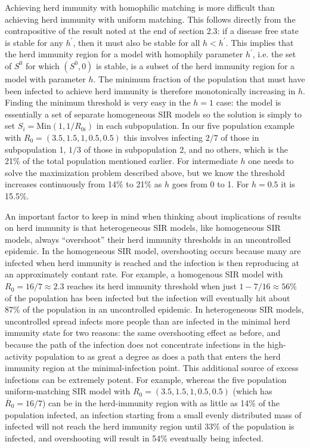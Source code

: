 \documentclass[11pt]{article}
\begin{document}
Achieving herd immunity with homophilic matching is more difficult than achieving herd immunity with uniform matching. This follows directly from the
contrapositive of the result noted at the end of section 2.3:
if a disease free state is stable for any $h^{\prime}$, then it must also be stable for all 
$h < h^{\prime}$. This implies that the herd immunity
region for a model with homophily parameter $h^{\prime}$, i.e. the set of $S^0$ for which $(S^0,0)$ is stable, is a subset of the herd immunity region for a model with parameter $h$. The minimum fraction of the population that must have
been infected to achieve herd immunity is therefore monotonically increasing in $h$. Finding the 
minimum threshold is very easy in the $h=1$ case:
the model is essentially a set of separate homogeneous SIR models so the solution is simply to set $S_i = \mbox{Min}(1, 1/R_{0i})$ in each subpopulation. In our five population example with
$R_0 = (3.5, 1.5, 1, 0.5, 0.5)$ this involves
infecting $2/7$ of those in subpopulation 1, $1/3$ of those in subpopulation 2, and no others, which is the 21\% of the total population mentioned earlier. For intermediate $h$ one needs to solve the maximization problem described above, but we know the threshold increases continuously from
14\% to 21\% as $h$ goes from 0 to 1. For $h=0.5$ it is 15.5\%.

An important factor to keep in mind when thinking about implications of results on herd immunity is that heterogeneous SIR models, 
like homogeneous SIR models, always ``overshoot'' their herd immunity thresholds in an uncontrolled epidemic. 
In the homogeneous SIR model, overshooting occurs because many are infected when herd immunity is reached 
and the infection is then reproducing at an approximately contant rate. For example, a homogenous SIR model with
$R_0 = 16/7 \approx 2.3$ reaches its herd immunity threshold when just $1 - 7/16 \approx 56\%$ of the population has been infected but the infection will eventually hit about 87\% of the population in an
uncontrolled epidemic.
In heterogeneous SIR models, uncontrolled spread infects more people than are infected in the minimal herd immunity state for two reasons: the same overshooting effect as before, and because the path of the infection does not concentrate infections 
in the high-activity population to as great a degree as does a path that enters the herd immunity region at the  minimal-infection point. This additional source of excess infections can 
be extremely potent. For example, whereas the five population uniform-matching SIR model with 
$R_0 = (3.5, 1.5, 1, 0.5, 0.5)$ (which has $\overline{R}_0=16/7$) can be in the herd-immunity region with as little as 14\% of the population infected, an infection starting from
a small evenly distributed mass of infected will not reach the herd immunity region until 33\% of the population is infected, and overshooting
will result in 54\% eventually being infected. 
\end{document}

